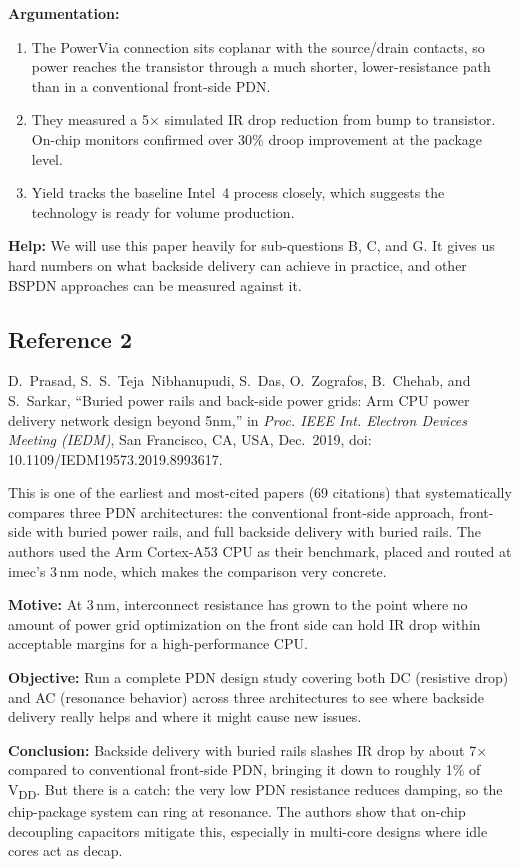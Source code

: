\documentclass[conference,a4paper]{IEEEtran}
\begin{document}
\textbf{Argumentation:}
\begin{enumerate}
    \item The PowerVia connection sits coplanar with the source/drain contacts, so power reaches the transistor through a much shorter, lower-resistance path than in a conventional front-side PDN.
    \item They measured a 5$\times$ simulated IR drop reduction from bump to transistor. On-chip monitors confirmed over 30\% droop improvement at the package level.
    \item Yield tracks the baseline Intel~4 process closely, which suggests the technology is ready for volume production.
\end{enumerate}

\textbf{Help:} We will use this paper heavily for sub-questions B, C, and G. It gives us hard numbers on what backside delivery can achieve in practice, and other BSPDN approaches can be measured against it.

\bigskip

\subsection{Reference 2}
D.~Prasad, S.~S.~Teja~Nibhanupudi, S.~Das, O.~Zografos, B.~Chehab, and S.~Sarkar, ``Buried power rails and back-side power grids: Arm CPU power delivery network design beyond 5nm,'' in \textit{Proc. IEEE Int. Electron Devices Meeting (IEDM)}, San Francisco, CA, USA, Dec.~2019, doi: 10.1109/IEDM19573.2019.8993617.

This is one of the earliest and most-cited papers (69 citations) that systematically compares three PDN architectures: the conventional front-side approach, front-side with buried power rails, and full backside delivery with buried rails. The authors used the Arm Cortex-A53 CPU as their benchmark, placed and routed at imec's 3\,nm node, which makes the comparison very concrete.

\textbf{Motive:} At 3\,nm, interconnect resistance has grown to the point where no amount of power grid optimization on the front side can hold IR drop within acceptable margins for a high-performance CPU.

\textbf{Objective:} Run a complete PDN design study covering both DC (resistive drop) and AC (resonance behavior) across three architectures to see where backside delivery really helps and where it might cause new issues.

\textbf{Conclusion:} Backside delivery with buried rails slashes IR drop by about 7$\times$ compared to conventional front-side PDN, bringing it down to roughly 1\% of V\textsubscript{DD}. But there is a catch: the very low PDN resistance reduces damping, so the chip-package system can ring at resonance. The authors show that on-chip decoupling capacitors mitigate this, especially in multi-core designs where idle cores act as decap.
\end{document}
